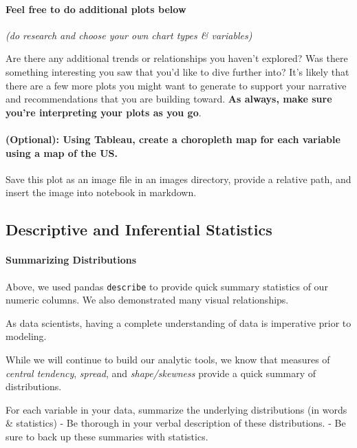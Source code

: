 \documentclass[11pt]{article}
\begin{document}
    \paragraph{Feel free to do additional plots
below}\label{feel-free-to-do-additional-plots-below}

\emph{(do research and choose your own chart types \& variables)}

Are there any additional trends or relationships you haven't explored?
Was there something interesting you saw that you'd like to dive further
into? It's likely that there are a few more plots you might want to
generate to support your narrative and recommendations that you are
building toward. \textbf{As always, make sure you're interpreting your
plots as you go}.

    \paragraph{(Optional): Using Tableau, create a choropleth map for each
variable using a map of the
US.}\label{optional-using-tableau-create-a-choropleth-map-for-each-variable-using-a-map-of-the-us.}

Save this plot as an image file in an images directory, provide a
relative path, and insert the image into notebook in markdown.

    \subsection{Descriptive and Inferential
Statistics}\label{descriptive-and-inferential-statistics}

    \paragraph{Summarizing Distributions}\label{summarizing-distributions}

Above, we used pandas \texttt{describe} to provide quick summary
statistics of our numeric columns. We also demonstrated many visual
relationships.

As data scientists, having a complete understanding of data is
imperative prior to modeling.

While we will continue to build our analytic tools, we know that
measures of \emph{central tendency}, \emph{spread}, and
\emph{shape/skewness} provide a quick summary of distributions.

For each variable in your data, summarize the underlying distributions
(in words \& statistics) - Be thorough in your verbal description of
these distributions. - Be sure to back up these summaries with
statistics.
\end{document}
